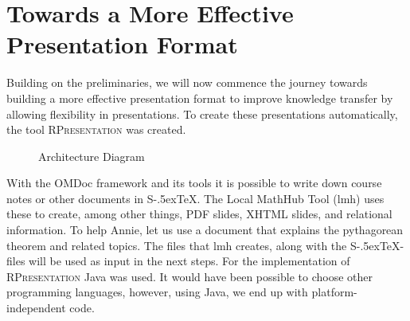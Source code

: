 \documentclass[twoside, 12pt]{article}
\def\stex{\texorpdfstring{\raisebox{-.5ex}S\kern-.5ex\TeX}{sTeX}\xspace}
\newcommand{\sys}{\textsc{RPresentation}\xspace}
\begin{document}
\section{Towards a More Effective Presentation Format}
\label{sec:TowardsAMoreEffectivePresentationFormat}

Building on the preliminaries, we will now commence the journey towards building a more effective presentation format to improve knowledge transfer by allowing flexibility in presentations. To create these presentations automatically, the tool \sys \cite{npentrel:npentrel15} was created.\\

\begin{figure}
\vspace{-26pt}
  \begin{center}
\vspace{-5pt}
  \caption{Architecture Diagram}
  \label{fig:architecture}
\vspace{12pt}
  \end{center}
\end{figure}

\begin{figure}
\vspace{-50pt}
\end{figure}

With the OMDoc framework and its tools it is possible to write down course notes or other documents in \stex. The Local MathHub Tool (lmh) uses these to create, among other things, PDF slides, XHTML slides, and relational information. To help Annie, let us use a document that explains the pythagorean theorem and related topics. The files that lmh creates, along with the \stex -files will be used as input in the next steps. For the implementation of  \sys Java was used. It would have been possible to choose other programming languages, however, using Java, we end up with platform-independent code.\\
\end{document}
